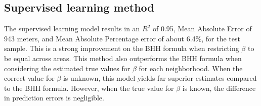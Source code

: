 \subsection{Supervised learning method}
The supervised learning model results in an $R^2$ of 0.95, Mean Absolute Error of 943 meters, and Mean Absolute Percentage error of about 6.4\%, for the test
sample. This is a strong improvement on the BHH formula when restricting $\beta$ to be equal across areas. This method also outperforms the BHH formula
when considering the estimated true values for $\beta$ for each neighborhood. 
When the correct value for $\beta$ is unknown, this model yields far superior estimates compared to the BHH formula. However, when the true value for 
$\beta$ is known, the difference in prediction errors is negligible.
